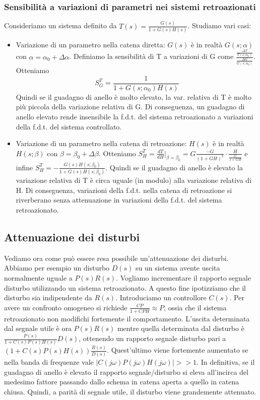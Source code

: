 \documentclass[11pt]{article}
\begin{document}
\subsubsection{Sensibilità a variazioni di parametri nei sistemi retroazionati}
Consideriamo un sistema definito da $T(s)=\frac{G(s)}{1+G(s)H(s)}$. Studiamo vari casi:
\begin{itemize}
    \item Variazione di un parametro nella catena diretta: $G(s)$ è in realtà $G(s;\alpha)$ con $\alpha=\alpha_0+\Delta\alpha$. Definiamo la sensibilità di T a variazioni di G come $\frac{\frac{\Delta T}{T(s;\alpha_0)}}{\frac{\Delta G}{G(s;\alpha_0)}}$. Otteniamo \begin{displaymath}
              S_G^T=\frac{1}{1+G(s;\alpha_0)H(s)}
          \end{displaymath} Quindi se il guadagno di anello è molto elevato, la var. relativa di T è molto più piccola della variazione relativa di G. Di conseguenza, un guadagno di anello elevato rende insensibile la f.d.t. del sistema retroazionato a variazioni della f.d.t. del sistema controllato.
    \item Variazione di un parametro nella catena di retroazione: $H(s)$ è in realtà $H(s;\beta)$ con $\beta = \beta_0+\Delta\beta$. Otteniamo $S_H^T = \frac{dT}{dH}|_{\beta=\beta_0}=G\frac{-G}{(1+GH)^2}\cdot\frac{H}{\frac{G}{1+GH}}$ e infine $S_H^T = -\frac{G(s)H(s;\beta_0)}{1+G(s)H(s;\beta_0)}$. Quindi se il guadagno di anello è elevato la variazione relativa di T è circa uguale (in modulo) alla variazione relativa di H. Di conseguenza, variazioni della f.d.t. nella catena di retroazione si riverberano senza attenuazione in variazioni della f.d.t. del sistema retroazionato.
\end{itemize}
\subsection{Attenuazione dei disturbi}
Vediamo ora come può essere resa possibile un'attenuazione dei disturbi. Abbiamo per esempio un disturbo $D(s)$ su un sistema avente uscita normalmente uguale a $P(s)R(s)$. Vogliamo incrementare il rapporto segnale disturbo utilizzando un sistema retroazionato. A questo fine ipotizziamo che il disturbo sia indipendente da $R(s)$. Introduciamo un controllore $C(s)$. Per avere un confronto omogeneo si richiede $\frac{CP}{1+CPH} \approx P$, ossia che il sistema retroazionato non modifichi fortemente il comportamento. L'uscita determinata dal segnale utile è ora $P(s)R(s)$ mentre quella determinata dal disturbo è $\frac{P(s)}{1+C(s)P(s)H(s)}D(s)$, ottenendo un rapporto segnale disturbo pari a $\left(1+C(s)P(s)H(s)\right)\frac{R(s)}{D(s)}$. Quest'ultimo viene fortemente aumentato se nella banda di frequenze vale $|C(j\omega)P(j\omega)H(j\omega)|>>1$. In definitiva, se il guadagno di anello è elevato il rapporto segnale/disturbo si eleva all'incirca del medesimo fattore passando dallo schema in catena aperta a quello in catena chiusa. Quindi, a parità di segnale utile, il disturbo viene grandemente attenuato.
\end{document}
